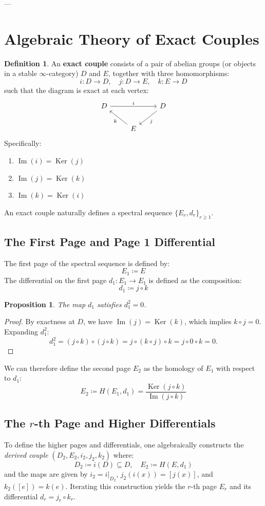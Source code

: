 \documentclass[a4paper,11pt]{article}
\theoremstyle{plain}
\newtheorem{prop}[thm]{Proposition}
\theoremstyle{definition}
\newtheorem{defn}[thm]{Definition}
\theoremstyle{remark}
\newcommand{\Image}{\operatorname{Im}}
\begin{document}
---

\section{Algebraic Theory of Exact Couples}

\begin{defn}
An \textbf{exact couple} consists of a pair of abelian groups (or objects in a stable $\infty$-category) $D$ and $E$, together with three homomorphisms:
\[
i \colon D \to D, \quad j \colon D \to E, \quad k \colon E \to D
\]
such that the diagram is exact at each vertex:
\[
\begin{tikzcd}
D \arrow[rr, "i"] & & D \arrow[dl, "j"] \\
& E \arrow[ul, "k"]
\end{tikzcd}
\]
Specifically:
\begin{enumerate}
    \item $\Image(i) = \operatorname{Ker}(j)$
    \item $\Image(j) = \operatorname{Ker}(k)$
    \item $\Image(k) = \operatorname{Ker}(i)$
\end{enumerate}
\end{defn}

An exact couple naturally defines a spectral sequence $\{E_r, d_r\}_{r \geq 1}$. 

\subsection{The First Page and Page 1 Differential}
The first page of the spectral sequence is defined by:
\[
E_1 \coloneqq E
\]
The differential on the first page $d_1 \colon E_1 \to E_1$ is defined as the composition:
\[
d_1 \coloneqq j \circ k
\]
\begin{prop}
The map $d_1$ satisfies $d_1^2 = 0$.
\end{prop}
\begin{proof}
By exactness at $D$, we have $\Image(j) = \operatorname{Ker}(k)$, which implies $k \circ j = 0$. Expanding $d_1^2$:
\[
d_1^2 = (j \circ k) \circ (j \circ k) = j \circ (k \circ j) \circ k = j \circ 0 \circ k = 0.
\]
\end{proof}

We can therefore define the second page $E_2$ as the homology of $E_1$ with respect to $d_1$:
\[
E_2 \coloneqq H(E_1, d_1) = \frac{\operatorname{Ker}(j \circ k)}{\Image(j \circ k)}
\]

\subsection{The $r$-th Page and Higher Differentials}
To define the higher pages and differentials, one algebraically constructs the \emph{derived couple} $(D_2, E_2, i_2, j_2, k_2)$ where:
\[
D_2 \coloneqq i(D) \subseteq D, \quad E_2 \coloneqq H(E, d_1)
\]
and the maps are given by $i_2 = i|_{D_2}$, $j_2(i(x)) = [j(x)]$, and $k_2([e]) = k(e)$. Iterating this construction yields the $r$-th page $E_r$ and its differential $d_r = j_r \circ k_r$. 
\end{document}
